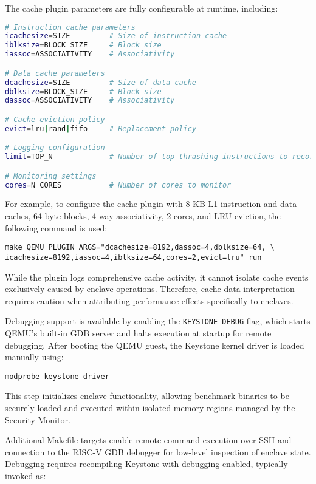 The cache plugin \cite{mandour2021cache} parameters are fully configurable at runtime, including:

\begin{lstlisting}[language=bash,caption={Configuration options for cache simulation},label={lst:cache_config}]
# Instruction cache parameters
icachesize=SIZE         # Size of instruction cache
iblksize=BLOCK_SIZE     # Block size
iassoc=ASSOCIATIVITY    # Associativity

# Data cache parameters
dcachesize=SIZE         # Size of data cache
dblksize=BLOCK_SIZE     # Block size
dassoc=ASSOCIATIVITY    # Associativity

# Cache eviction policy
evict=lru|rand|fifo     # Replacement policy

# Logging configuration
limit=TOP_N             # Number of top thrashing instructions to record

# Monitoring settings
cores=N_CORES           # Number of cores to monitor
\end{lstlisting}


For example, to configure the cache plugin with 8 KB L1 instruction and data caches, 64-byte blocks, 4-way associativity, 2 cores, and LRU eviction, the following command is used:

\begin{lstlisting}
make QEMU_PLUGIN_ARGS="dcachesize=8192,dassoc=4,dblksize=64, \
icachesize=8192,iassoc=4,iblksize=64,cores=2,evict=lru" run
\end{lstlisting}

While the plugin logs comprehensive cache activity, it cannot isolate cache events exclusively caused by enclave operations. Therefore, cache data interpretation requires caution when attributing performance effects specifically to enclaves.

Debugging support is available by enabling the \texttt{KEYSTONE\_DEBUG} flag, which starts QEMU’s built-in GDB server and halts execution at startup for remote debugging. After booting the QEMU guest, the Keystone kernel driver is loaded manually using:


\begin{lstlisting}
modprobe keystone-driver
\end{lstlisting}

This step initializes enclave functionality, allowing benchmark binaries to be securely loaded and executed within isolated memory regions managed by the Security Monitor.

Additional Makefile targets enable remote command execution over SSH and connection to the RISC-V GDB debugger for low-level inspection of enclave state. Debugging requires recompiling Keystone with debugging enabled, typically invoked as:

